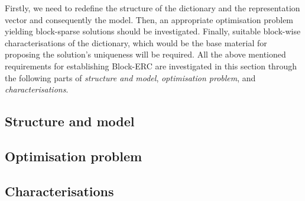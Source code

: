 Firstly, we need to redefine the structure of the dictionary and the representation vector and consequently the model.
Then, an appropriate optimisation problem yielding block-sparse solutions should be investigated.
Finally, suitable block-wise characterisations of the dictionary, which would be the base material for proposing the solution's uniqueness will be required.
All the above mentioned requirements for establishing Block-ERC are investigated in this section through the following parts of \emph{structure and model}, \emph{optimisation problem}, and \emph{characterisations}.
\subsection{Structure and model}
\label{sec:Structure and the model} 

\subsection{Optimisation problem}

\newpage
\subsection{Characterisations}

